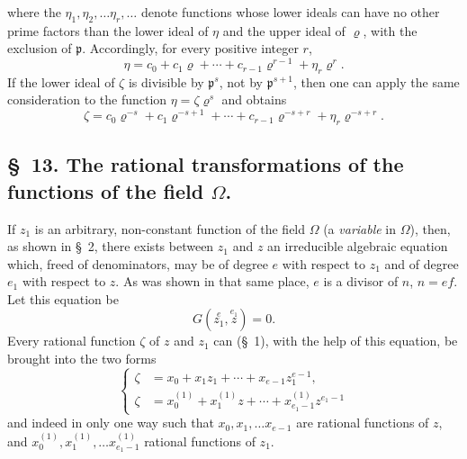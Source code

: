 \documentclass{article}
\begin{document}
where the $\eta_{1}, \eta_{2}, \ldots \eta_{r}, \ldots$ denote functions whose lower ideals can have no other prime factors than the lower ideal of $\eta$ and the upper ideal of $\varrho$, with the exclusion of $\mathfrak{p}$. Accordingly, for every positive integer $r$,
\[ \eta = c_{0} + c_{1}\varrho + \cdots + c_{r-1}\varrho^{r-1} + \eta_{r}\varrho^{r}. \]
If the lower ideal of $\zeta$ is divisible by $\mathfrak{p}^{s}$, not by $\mathfrak{p}^{s+1}$, then one can apply the same consideration to the function $\eta = \zeta\varrho^{s}$ and obtains
\[ \zeta = c_{0}\varrho^{-s} + c_{1}\varrho^{-s+1} + \cdots + c_{r-1}\varrho^{-s+r} + \eta_{r}\varrho^{-s+r}. \]


\subsection*{§~13. The rational transformations of the functions of the field $\Omega$.}

If $z_{1}$ is an arbitrary, non-constant function of the field $\Omega$ (a \emph{variable} in $\Omega$), then, as shown in §~2, there exists between $z_{1}$ and $z$ an irreducible algebraic equation which, freed of denominators, may be of degree $e$ with respect to $z_{1}$ and of degree $e_{1}$ with respect to $z$. As was shown in that same place, $e$ is a divisor of $n$, $n = ef$. Let this equation be
\[ G(\overset{e}{z_{1}}, \overset{e_{1}}{z}) = 0. \tag{1.} \]
Every rational function $\zeta$ of $z$ and $z_{1}$ can (§~1), with the help of this equation, be brought into the two forms
\[ \left\{ \begin{aligned} \zeta &= x_{0} + x_{1}z_{1} + \cdots + x_{e-1}z_{1}^{e-1}, \\ \zeta &= x_{0}^{(1)} + x_{1}^{(1)}z + \cdots + x_{e_{1}-1}^{(1)}z^{e_{1}-1} \end{aligned} \right. \tag{2.} \]
and indeed in only one way such that $x_{0}, x_{1}, \ldots x_{e-1}$ are rational functions of $z$, and $x_{0}^{(1)}, x_{1}^{(1)}, \ldots x_{e_{1}-1}^{(1)}$ rational functions of $z_{1}$.
\end{document}
